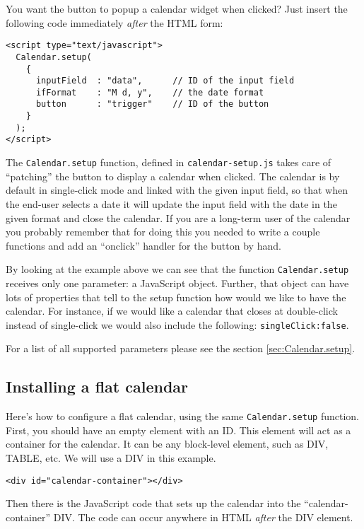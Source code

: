 \documentclass[a4paper,10pt]{article}
\begin{document}
\noindent You want the button to popup a calendar widget when clicked?  Just
insert the following code immediately \emph{after} the HTML form:

\begin{verbatim}
<script type="text/javascript">
  Calendar.setup(
    {
      inputField  : "data",      // ID of the input field
      ifFormat    : "M d, y",    // the date format
      button      : "trigger"    // ID of the button
    }
  );
</script>
\end{verbatim}

The \texttt{Calendar.setup} function, defined in \texttt{calendar-setup.js}
takes care of ``patching'' the button to display a calendar when clicked.  The
calendar is by default in single-click mode and linked with the given input
field, so that when the end-user selects a date it will update the input field
with the date in the given format and close the calendar.  If you are a
long-term user of the calendar you probably remember that for doing this you
needed to write a couple functions and add an ``onclick'' handler for the
button by hand.

By looking at the example above we can see that the function
\texttt{Calendar.setup} receives only one parameter: a JavaScript object.
Further, that object can have lots of properties that tell to the setup
function how would we like to have the calendar.  For instance, if we would
like a calendar that closes at double-click instead of single-click we would
also include the following: \texttt{singleClick:false}.

For a list of all supported parameters please see the section
\ref{sec:Calendar.setup}.

\subsection{Installing a flat calendar}\label{sec:quick-start-flat}

Here's how to configure a flat calendar, using the same \texttt{Calendar.setup}
function.  First, you should have an empty element with an ID.  This element
will act as a container for the calendar.  It can be any block-level element,
such as DIV, TABLE, etc.  We will use a DIV in this example.

\begin{verbatim}
<div id="calendar-container"></div>
\end{verbatim}

Then there is the JavaScript code that sets up the calendar into the
``calendar-container'' DIV.  The code can occur anywhere in HTML
\emph{after} the DIV element.
\end{document}
